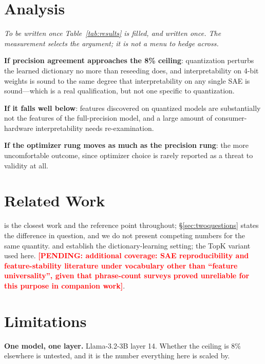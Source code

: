 \documentclass[11pt,a4paper]{article}
\newcounter{pendingcount}
\DeclareRobustCommand{\pending}[1]{\stepcounter{pendingcount}%
  \textcolor{red}{\textbf{[PENDING: #1]}}}
\begin{document}
\section{Analysis}

\emph{To be written once Table~\ref{tab:results} is filled, and written once. The
measurement selects the argument; it is not a menu to hedge across.}

\textbf{If precision agreement approaches the 8\% ceiling}: quantization perturbs the
learned dictionary no more than reseeding does, and interpretability on 4-bit weights
is sound to the same degree that interpretability on any single SAE is sound---which is
a real qualification, but not one specific to quantization.

\textbf{If it falls well below}: features discovered on quantized models are
substantially not the features of the full-precision model, and a large amount of
consumer-hardware interpretability needs re-examination.

\textbf{If the optimizer rung moves as much as the precision rung}: the more
uncomfortable outcome, since optimizer choice is rarely reported as a threat to
validity at all.

\section{Related Work}

\citet{duan2026quant} is the closest work and the reference point throughout;
\S\ref{sec:twoquestions} states the difference in question, and we do not present
competing numbers for the same quantity. \citet{bricken2023monosemanticity} and
\citet{cunningham2023sparse} establish the dictionary-learning setting;
\citet{gao2024topk} the TopK variant used here. \pending{additional coverage: SAE
reproducibility and feature-stability literature under vocabulary other than
``feature universality'', given that phrase-count surveys proved unreliable for this
purpose in companion work}.

\section{Limitations}

\textbf{One model, one layer.} Llama-3.2-3B layer 14. Whether the ceiling is
8\% elsewhere is untested, and it is the number everything here is scaled by.
\end{document}
